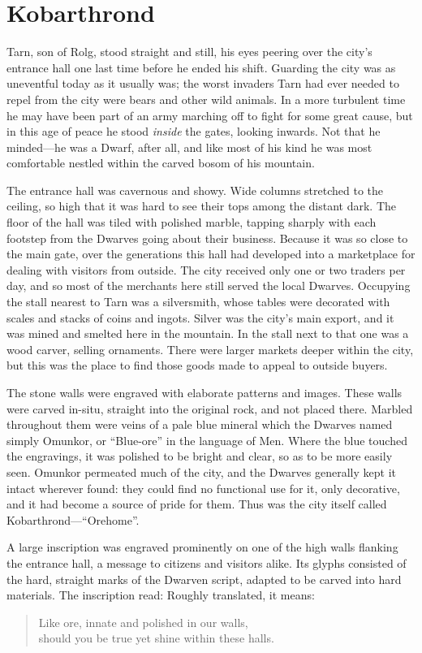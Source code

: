 \chapter{Kobarthrond}
Tarn, son of Rolg, stood straight and still, his eyes peering over the city's entrance hall one last time before he ended his shift.  Guarding the city was as uneventful today as it usually was; the worst invaders Tarn had ever needed to repel from the city were bears and other wild animals.  In a more turbulent time he may have been part of an army marching off to fight for some great cause, but in this age of peace he stood \emph{inside} the gates, looking inwards.  Not that he minded---he was a Dwarf, after all, and like most of his kind he was most comfortable nestled within the carved bosom of his mountain.

The entrance hall was cavernous and showy.  Wide columns stretched to the ceiling, so high that it was hard to see their tops among the distant dark.  The floor of the hall was tiled with polished marble, tapping sharply with each footstep from the Dwarves going about their business.  Because it was so close to the main gate, over the generations this hall had developed into a marketplace for dealing with visitors from outside.  The city received only one or two traders per day, and so most of the merchants here still served the local Dwarves.  Occupying the stall nearest to Tarn was a silversmith, whose tables were decorated with scales and stacks of coins and ingots.  Silver was the city's main export, and it was mined and smelted here in the mountain.  In the stall next to that one was a wood carver, selling ornaments.  There were larger markets deeper within the city, but this was the place to find those goods made to appeal to outside buyers.

The stone walls were engraved with elaborate patterns and images.  These walls were carved in-situ, straight into the original rock, and not placed there.  Marbled throughout them were veins of a pale blue mineral which the Dwarves named simply Omunkor, or ``Blue-ore'' in the language of Men.  Where the blue touched the engravings, it was polished to be bright and clear, so as to be more easily seen.  Omunkor permeated much of the city, and the Dwarves generally kept it intact wherever found: they could find no functional use for it, only decorative, and it had become a source of pride for them.  Thus was the city itself called Kobarthrond---``Orehome''.

A large inscription was engraved prominently on one of the high walls flanking the entrance hall, a message to citizens and visitors alike.  Its glyphs consisted of the hard, straight marks of the Dwarven script, adapted to be carved into hard materials.  The inscription read:
Roughly translated, it means:
\begin{verse}
Like ore, innate and polished in our walls,\\
should you be true yet shine within these halls.
\end{verse}

